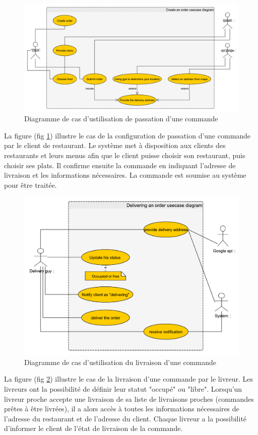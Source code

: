 \documentclass[french, a4paper, 12pt]{report}
\begin{document}
			\newpage
			\begin{figure}[!h]
  				\center
  				\includegraphics[width=15cm]{usecaseorder.png}
  				\caption{Diagramme de cas d'ustilisation de passation d'une commande}
  				\label{fig:usecaseorder}
			\end{figure}
			La figure (fig \ref{fig:usecaseorder}) illustre le cas de la configuration de passation d'une commande par le client de restaurant. Le système met à disposition aux clients des restaurants et leurs menus afin que le client puisse choisir son restaurant,
puis choisir ses plats. Il confirme ensuite la commande en indiquant l'adresse de livraison et les informations nécessaires. La commande est soumise au système pour être traitée.
			
			\newpage
			\begin{figure}[!h]
  				\center
  				\includegraphics[width=15cm]{usecasedeliver.png}
  				\caption{Diagramme de cas d'ustilisation du livraison d'une commande}
  				\label{fig:usecasedeliver}
			\end{figure}
			La figure (fig \ref{fig:usecasedeliver}) illustre le cas de la livraison d'une commande par le livreur. Les livreurs ont la possibilité de définir leur statut "occupé" ou "libre". Lorsqu'un livreur proche accepte une livraison de sa liste de livraisons proches (commandes prêtes à être livrées), il a alors accès à toutes les informations nécessaires de l'adresse du restaurant et de l'adresse du client.
Chaque livreur a la possibilité d'informer le client de l'état de livraison de la commande.
			
\end{document}
